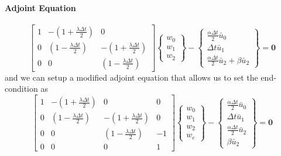 \documentclass[10pt, oneside]{article}
\newcommand{\vect}[1]{\mathbf{#1}}
\begin{document}
\paragraph{Adjoint Equation}
\[ 
\begin{bmatrix}
1 & -(1+\frac{\lambda\Delta t}{2})  & 0 \\
0 &( 1-\frac{\lambda\Delta t}{2}) & -(1+\frac{\lambda\Delta t}{2}) \\[0.5ex]
0 & 0  & (1-\frac{\lambda\Delta t}{2})
\end{bmatrix}
\begin{Bmatrix}
w_0 \\ w_1 \\ w_2 
\end{Bmatrix} -
\begin{Bmatrix}
\frac{\alpha\Delta t}{2} \bar u_0 \\
\Delta t \bar u_1 \\
\frac{\alpha\Delta t}{2} \bar u_2 + \beta \bar u_2
\end{Bmatrix} = \vect{0}
\]
and we can setup a modified adjoint equation that allows us to set the end-condition as
%
\begin{equation} \label{e:adjoint}
\begin{bmatrix}
1 & -(1+\frac{\lambda\Delta t}{2})  & 0 & 0 \\
0 &( 1-\frac{\lambda\Delta t}{2}) & -(1+\frac{\lambda\Delta t}{2}) & 0 \\[0.5ex]
0 & 0  & (1-\frac{\lambda\Delta t}{2}) & -1 \\
0 & 0 & 0 & 1
\end{bmatrix}
\begin{Bmatrix}
w_0 \\ w_1 \\ w_2 \\ w_e
\end{Bmatrix} -
\begin{Bmatrix}
\frac{\alpha\Delta t}{2} \bar u_0 \\
\Delta t \bar u_1 \\
\frac{\alpha\Delta t}{2} \bar u_2 \\ 
\beta \bar u_2
\end{Bmatrix} = \vect{0}
\end{equation}
%
\end{document}
